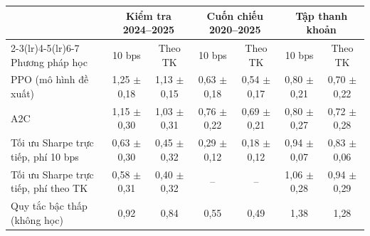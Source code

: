 \begin{tabular}{@{}lcccccc@{}}
\toprule
 & \multicolumn{2}{c}{Kiểm tra 2024--2025} & \multicolumn{2}{c}{Cuốn chiếu 2020--2025} & \multicolumn{2}{c}{Tập thanh khoản} \\
\cmidrule(lr){2-3}\cmidrule(lr){4-5}\cmidrule(lr){6-7}
Phương pháp học & 10 bps & Theo TK & 10 bps & Theo TK & 10 bps & Theo TK \\
\midrule
PPO (mô hình đề xuất) & 1{,}25 $\pm$ 0{,}18 & 1{,}13 $\pm$ 0{,}15 & 0{,}63 $\pm$ 0{,}18 & 0{,}54 $\pm$ 0{,}17 & 0{,}80 $\pm$ 0{,}21 & 0{,}70 $\pm$ 0{,}22 \\
A2C & 1{,}15 $\pm$ 0{,}30 & 1{,}03 $\pm$ 0{,}31 & 0{,}76 $\pm$ 0{,}22 & 0{,}69 $\pm$ 0{,}21 & 0{,}80 $\pm$ 0{,}27 & 0{,}72 $\pm$ 0{,}28 \\
Tối ưu Sharpe trực tiếp, phí 10 bps & 0{,}63 $\pm$ 0{,}30 & 0{,}45 $\pm$ 0{,}32 & 0{,}29 $\pm$ 0{,}12 & 0{,}18 $\pm$ 0{,}12 & 0{,}94 $\pm$ 0{,}07 & 0{,}83 $\pm$ 0{,}06 \\
Tối ưu Sharpe trực tiếp, phí theo TK & 0{,}58 $\pm$ 0{,}31 & 0{,}40 $\pm$ 0{,}32 & -- & -- & 1{,}06 $\pm$ 0{,}28 & 0{,}94 $\pm$ 0{,}29 \\
Quy tắc bậc thấp (không học) & 0{,}92 & 0{,}84 & 0{,}55 & 0{,}49 & 1{,}38 & 1{,}28 \\
\bottomrule
\end{tabular}
